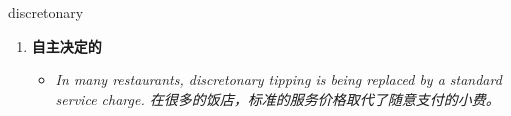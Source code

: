 
\begin{frame}
{\huge discretonary}
\begin{center}
\begin{enumerate}\Large
  \item \textbf{自主决定的}
  \begin{itemize}
    \item \em{\Large{In many restaurants, discretonary tipping is being replaced by a standard service charge. 在很多的饭店，标准的服务价格取代了随意支付的小费。}}
  \end{itemize}
\end{enumerate}
\end{center}
\end{frame}
